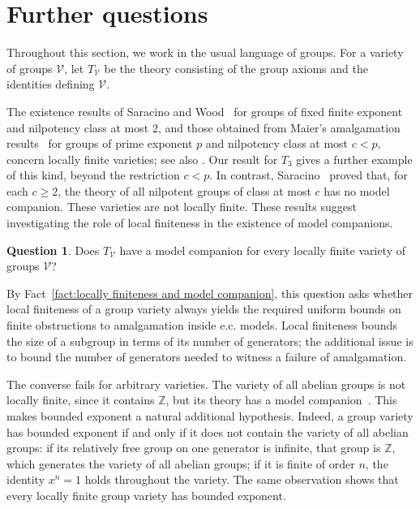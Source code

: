 \documentclass[11pt,reqno]{article}
\theoremstyle{definition}
\newtheorem{question}[theorem]{Question}
\theoremstyle{remark}
\begin{document}
\section{Further questions}
\label{sec:questions}

Throughout this section, we work in the usual language of groups.
For a variety of groups $\mathcal V$, let $T_{\mathcal V}$ be the
theory consisting of the group axioms and the identities defining
$\mathcal V$.

The existence results of Saracino and Wood~\cite{SaracinoWood1979}
for groups of fixed finite exponent and nilpotency class at most $2$,
and those obtained from Maier's amalgamation
results~\cite{Maier1989} for groups of prime exponent $p$ and
nilpotency class at most $c<p$, concern locally finite varieties;
see also \cite[Corollary~4.42]{dElbeeMuellerRamseySiniora2025}.
Our result for $T_3$ gives a further example of this kind, beyond
the restriction $c<p$.
In contrast, Saracino~\cite{Saracino1976} proved that, for each
$c\geq2$, the theory of all nilpotent groups of class at most $c$
has no model companion. These varieties are not locally finite.
These results suggest investigating the role of local finiteness
in the existence of model companions.

\begin{question}\label{question:locally-finite-varieties}
Does $T_{\mathcal V}$ have a model companion for every locally
finite variety of groups $\mathcal V$?
\end{question}

By Fact~\ref{fact:locally finiteness and model companion}, this
question asks whether local finiteness of a group variety always
yields the required uniform bounds on finite obstructions to
amalgamation inside e.c. models. Local finiteness bounds the size
of a subgroup in terms of its number of generators; the additional
issue is to bound the number of generators needed to witness a
failure of amalgamation.

The converse fails for arbitrary varieties. The variety of all
abelian groups is not locally finite, since it contains $\mathbb Z$,
but its theory has a model companion~\cite{EklofSabbagh1971}.
This makes bounded exponent a natural additional hypothesis.
Indeed, a group variety has bounded exponent if and only if it
does not contain the variety of all abelian groups: if its
relatively free group on one generator is infinite, that group is
$\mathbb Z$, which generates the variety of all abelian groups;
if it is finite of order $n$, the identity $x^n=1$ holds throughout
the variety. The same observation shows that every locally finite
group variety has bounded exponent.
\end{document}
